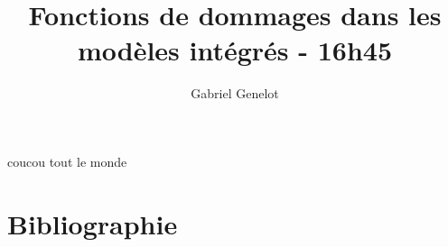 \documentclass{report}
\begin{document}





\title{Fonctions de dommages dans les modèles intégrés - 16h45}
\author{Gabriel Genelot}


\subject{\textit{Mémoire de recherche}} %
\affiliation{} %


% 
%
%

\tableofcontents

coucou tout le monde 


%













\setcounter{biburlnumpenalty}{7000}
\setcounter{biburllcpenalty}{7000}
\setcounter{biburlucpenalty}{7000}




\appendix

\printglossary[title=Glossaire]


\chapter{Bibliographie}
\begin{multicols}{2}
\printbibliography
\end{multicols}


%
%
\end{document}
